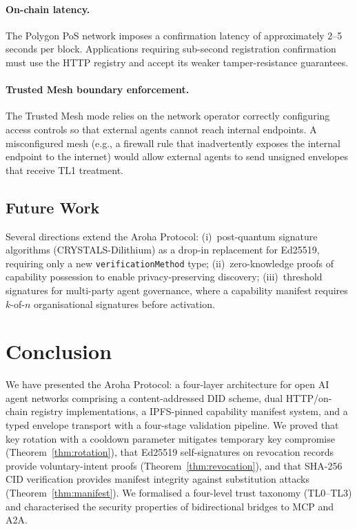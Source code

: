 \documentclass[conference]{IEEEtran}
\begin{document}
\paragraph{On-chain latency.}
The Polygon PoS network imposes a confirmation latency of
approximately 2--5 seconds per block. Applications requiring
sub-second registration confirmation must use the HTTP registry
and accept its weaker tamper-resistance guarantees.

\paragraph{Trusted Mesh boundary enforcement.}
The Trusted Mesh mode relies on the network operator correctly
configuring access controls so that external agents cannot reach
internal endpoints. A misconfigured mesh (e.g., a firewall rule
that inadvertently exposes the internal endpoint to the internet)
would allow external agents to send unsigned envelopes that
receive TL1 treatment.

\subsection{Future Work}

Several directions extend the Aroha Protocol:
(i)~post-quantum signature algorithms (CRYSTALS-Dilithium)
as a drop-in replacement for Ed25519, requiring only a
new \texttt{verificationMethod} type;
(ii)~zero-knowledge proofs of capability possession to enable
privacy-preserving discovery;
(iii)~threshold signatures for multi-party agent governance,
where a capability manifest requires $k$-of-$n$ organisational
signatures before activation.

\section{Conclusion}
\label{sec:conclusion}

We have presented the Aroha Protocol: a four-layer architecture
for open AI agent networks comprising a content-addressed DID
scheme, dual HTTP/on-chain registry implementations, a
IPFS-pinned capability manifest system, and a typed envelope
transport with a four-stage validation pipeline. We proved that
key rotation with a cooldown parameter mitigates temporary key
compromise (Theorem~\ref{thm:rotation}), that Ed25519
self-signatures on revocation records provide voluntary-intent
proofs (Theorem~\ref{thm:revocation}), and that SHA-256 CID
verification provides manifest integrity against substitution
attacks (Theorem~\ref{thm:manifest}). We formalised a
four-level trust taxonomy (TL0--TL3) and characterised the
security properties of bidirectional bridges to MCP and A2A.
\end{document}
